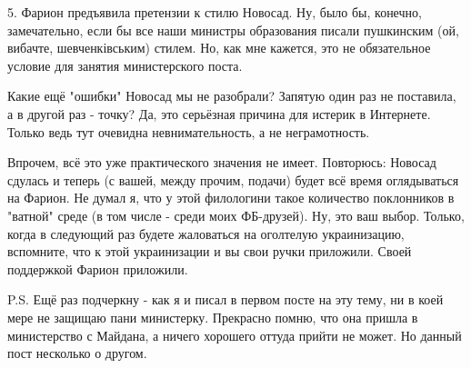 5. Фарион предъявила претензии к стилю Новосад. Ну, было бы, конечно,
замечательно, если бы все наши министры образования писали пушкинским (ой,
вибачте, шевченківським) стилем. Но, как мне кажется, это не обязательное
условие для занятия министерского поста.

Какие ещё "ошибки" Новосад мы не разобрали? Запятую один раз не поставила, а в
другой раз - точку? Да, это серьёзная причина для истерик в Интернете. Только
ведь тут очевидна невнимательность, а не неграмотность.

Впрочем, всё это уже практического значения не имеет.  Повторюсь: Новосад
сдулась и теперь (с вашей, между прочим, подачи) будет всё время оглядываться
на Фарион. Не думал я, что у этой филологини такое количество поклонников в
"ватной" среде (в том числе - среди моих ФБ-друзей). Ну, это ваш выбор. Только,
когда в следующий раз будете жаловаться на оголтелую украинизацию, вспомните,
что к этой украинизации и вы свои ручки приложили. Своей поддержкой Фарион
приложили. 

P.S. Ещё раз подчеркну - как я и писал в первом посте на эту тему, ни в коей
мере не защищаю пани министерку. Прекрасно помню, что она пришла в министерство
с Майдана, а ничего хорошего оттуда прийти не может. Но данный пост несколько о
другом.

